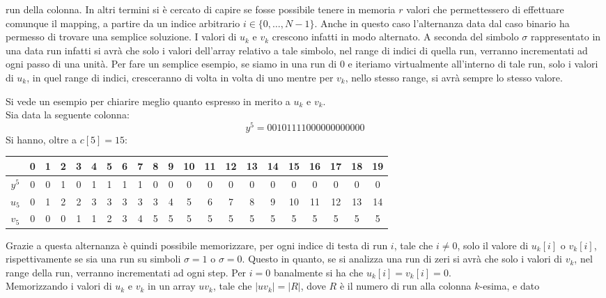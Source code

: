 run della colonna. In altri termini si è cercato di capire se fosse possibile
tenere in memoria $r$ valori che permettessero di effettuare comunque il
mapping, a partire da un indice arbitrario $i\in\{0,\ldots,N-1\}$. Anche in
questo caso l'alternanza data dal caso binario ha permesso di trovare una
semplice soluzione. I valori di $u_k$ e $v_k$ crescono infatti in modo
alternato. A seconda del simbolo $\sigma$ rappresentato in una data run infatti
si avrà che solo i valori dell'array relativo a tale simbolo, nel range di
indici di quella run, verranno incrementati ad ogni passo di una unità. Per fare
un semplice esempio, se siamo in una run di 0 e iteriamo virtualmente
all'interno di tale run, solo i valori di $u_k$, in quel
range di indici, cresceranno di volta in volta di uno mentre per $v_k$, nello
stesso range, si avrà sempre lo stesso valore.
\begin{esempio}
  Si vede un esempio per chiarire meglio quanto espresso in merito a $u_k$ e
  $v_k$.\\
  Sia data la seguente colonna:
  \[y^5=00101111000000000000\]
  Si hanno, oltre a $c[5]=15$:
  \begin{table}[H]
    \centering
    \begin{tabular}{c||cc|c|c|cccc|cccccccccccc}
      & 0 & 1 & 2 & 3 & 4 & 5 & 6 & 7 & 8 & 9 & 10 & 11 & 12 & 13 & 14 & 15 & 16
      & 17 & 18 & 19\\
      \hline
      \hline
      $y^5$ & 0 & 0 & 1 & 0 & 1 & 1 & 1 & 1 & 0 & 0 & 0 & 0 & 0 & 0 & 0 & 0 & 0
      & 0 & 0 & 0\\
      \hline
      \hline
      $u_5$ & 0 & 1 & 2 & 2 & 3 & 3 & 3 & 3 & 3 & 4 & 5 & 6 & 7 & 8 & 9 & 10
      & 11 & 12 & 13 & 14\\
      \hline
      $v_5$ & 0 & 0 & 0 & 1 & 1 & 2 & 3 & 4 & 5 & 5 & 5 & 5 & 5 & 5 & 5 & 5 & 5
      & 5 & 5 & 5
    \end{tabular}
  \end{table}
\end{esempio}
Grazie a questa alternanza è quindi possibile memorizzare, per ogni indice di
testa di run $i$, tale che $i\neq 0$, solo il valore di $u_k[i]$ o $v_k[i]$,
rispettivamente se sia una run su simboli $\sigma=1$ o $\sigma=0$. Questo in
quanto, se si analizza una run di zeri si avrà che solo i valori di $v_k$, nel
range della run, verranno incrementati ad ogni step. Per $i=0$ banalmente si ha
che $u_k[i]=v_k[i]=0$.\\
Memorizzando i valori di $u_k$ e $v_k$ in un array $uv_k$, tale che
$|uv_k|=|R|$, dove $R$ è il numero di run alla colonna $k$-esima, e dato

